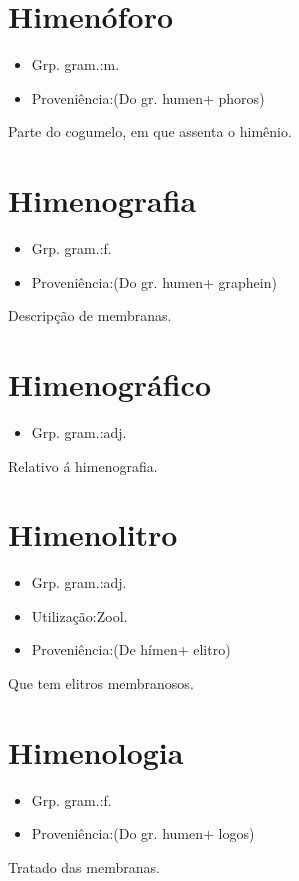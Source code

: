 \documentclass{article}
\begin{document}
\section{Himenóforo}
\begin{itemize}
\item {Grp. gram.:m.}
\end{itemize}
\begin{itemize}
\item {Proveniência:(Do gr. \textunderscore humen\textunderscore  + \textunderscore phoros\textunderscore )}
\end{itemize}
Parte do cogumelo, em que assenta o himênio.
\section{Himenografia}
\begin{itemize}
\item {Grp. gram.:f.}
\end{itemize}
\begin{itemize}
\item {Proveniência:(Do gr. \textunderscore humen\textunderscore  + \textunderscore graphein\textunderscore )}
\end{itemize}
Descripção de membranas.
\section{Himenográfico}
\begin{itemize}
\item {Grp. gram.:adj.}
\end{itemize}
Relativo á himenografia.
\section{Himenolitro}
\begin{itemize}
\item {Grp. gram.:adj.}
\end{itemize}
\begin{itemize}
\item {Utilização:Zool.}
\end{itemize}
\begin{itemize}
\item {Proveniência:(De \textunderscore hímen\textunderscore  + \textunderscore elitro\textunderscore )}
\end{itemize}
Que tem elitros membranosos.
\section{Himenologia}
\begin{itemize}
\item {Grp. gram.:f.}
\end{itemize}
\begin{itemize}
\item {Proveniência:(Do gr. \textunderscore humen\textunderscore  + \textunderscore logos\textunderscore )}
\end{itemize}
Tratado das membranas.
\end{document}
